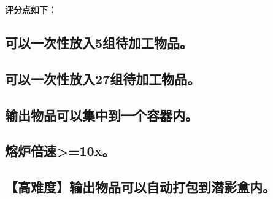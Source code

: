 \documentclass{exampaper}
\begin{document}
            \textbf{评分点如下：}

            \subsection{可以一次性放入5组待加工物品。}

            \subsection{可以一次性放入27组待加工物品。}

            \subsection{输出物品可以集中到一个容器内。}

            \subsection{熔炉倍速>=10x。}

            \subsection{【高难度】输出物品可以自动打包到潜影盒内。}
\end{document}
